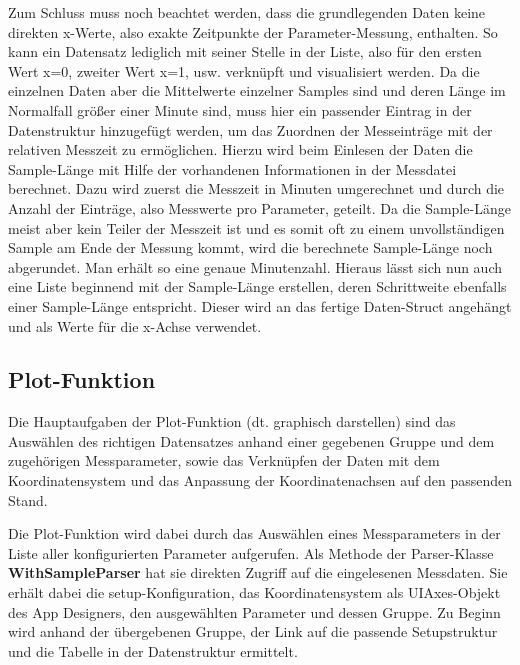 Zum Schluss muss noch beachtet werden, dass die grundlegenden Daten keine direkten x-Werte, also exakte Zeitpunkte der Parameter-Messung, enthalten. So kann ein Datensatz lediglich mit seiner Stelle in der Liste, also für den ersten Wert x=0, zweiter Wert x=1, usw. verknüpft und visualisiert werden. Da die einzelnen Daten aber die Mittelwerte einzelner Samples sind und deren Länge im Normalfall größer einer Minute sind, muss hier ein passender Eintrag in der Datenstruktur hinzugefügt werden, um das Zuordnen der Messeinträge mit der relativen Messzeit zu ermöglichen. Hierzu wird beim Einlesen der Daten die Sample-Länge mit Hilfe der vorhandenen Informationen in der Messdatei berechnet. Dazu wird zuerst die Messzeit in Minuten umgerechnet und durch die Anzahl der Einträge, also Messwerte pro Parameter, geteilt. Da die Sample-Länge meist aber kein Teiler der Messzeit ist und es somit oft zu einem unvollständigen Sample am Ende der Messung kommt, wird die berechnete Sample-Länge noch abgerundet. Man erhält so eine genaue Minutenzahl. Hieraus lässt sich nun auch eine Liste beginnend mit der Sample-Länge erstellen, deren Schrittweite ebenfalls einer Sample-Länge entspricht. Dieser wird an das fertige Daten-Struct angehängt und als Werte für die x-Achse verwendet.



\subsection{Plot-Funktion}

Die Hauptaufgaben der Plot-Funktion (dt. graphisch darstellen) sind das Auswählen des richtigen Datensatzes anhand einer gegebenen Gruppe und dem zugehörigen Messparameter, sowie das Verknüpfen der Daten mit dem Koordinatensystem und das Anpassung der Koordinatenachsen auf den passenden Stand.

Die Plot-Funktion wird dabei durch das Auswählen eines Messparameters in der Liste aller konfigurierten Parameter aufgerufen. Als Methode der Parser-Klasse \textbf{WithSampleParser} hat sie direkten Zugriff auf die eingelesenen Messdaten. Sie erhält dabei die setup-Konfiguration, das Koordinatensystem als UIAxes-Objekt des App Designers, den ausgewählten Parameter und dessen Gruppe. Zu Beginn wird anhand der übergebenen Gruppe, der Link auf die passende Setupstruktur und die Tabelle in der Datenstruktur ermittelt.

